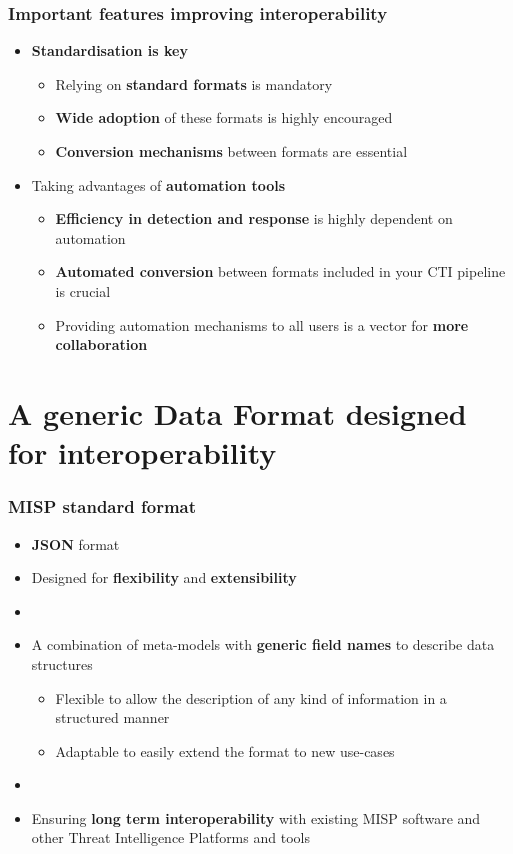 \begin{frame}
    \frametitle{Important features improving interoperability}
    \begin{itemize}
        \item \textbf{Standardisation is key}
        \begin{itemize}
            \item Relying on \textbf{standard formats} is mandatory
            \item \textbf{Wide adoption} of these formats is highly encouraged
            \item \textbf{Conversion mechanisms} between formats are essential
        \end{itemize}
        \item Taking advantages of \textbf{automation tools}
        \begin{itemize}
            \item \textbf{Efficiency in detection and response} is highly dependent on automation
            \item \textbf{Automated conversion} between formats included in your CTI pipeline is crucial
            \item Providing automation mechanisms to all users is a vector for \textbf{more collaboration}
        \end{itemize}
    \end{itemize}
\end{frame}

\section{A generic Data Format designed for interoperability}

\begin{frame}
    \frametitle{MISP standard format}
    \begin{itemize}
        \item \textbf{JSON} format
        \item Designed for \textbf{flexibility} and \textbf{extensibility}
        \item []
        \item A combination of meta-models with \textbf{generic field names} to describe data structures
        \begin{itemize}
            \item Flexible to allow the description of any kind of information in a structured manner
            \item Adaptable to easily extend the format to new use-cases
        \end{itemize}
        \item []
        \item Ensuring \textbf{long term interoperability} with existing MISP software and other Threat Intelligence Platforms and tools
    \end{itemize}
\end{frame}

